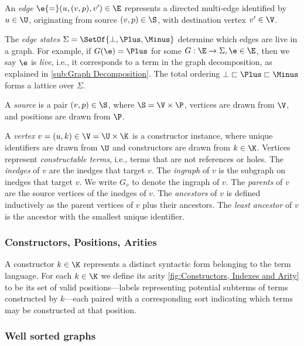 An \emph{edge} $\e{=}(u, (v, p), v^\prime) \in \E$ represents a directed multi-edge
identified by $u \in \U$, originating from source $(v, p) \in \S$, with destination vertex $v' \in \V$.

The \emph{edge states} $\Sigma = \SetOf{\bot, \Plus, \Minus}$ determine which edges are live in a graph.
For example, if $G(\e) = \Plus$ for some $G : \E \rightarrow \Sigma, \e \in \E$,
then we say $\e$ is \emph{live}, i.e., it corresponds to a term in the graph decomposition, as explained in \autoref{sub:Graph Decomposition}.
The total ordering $\bot \sqsubset \Plus \sqsubset \Minus$ forms a lattice over $\Sigma$.

A \emph{source} is a pair $(v, p) \in \S$,
  where $\S = \V \times \P$,
  vertices are drawn from $\V$,
  and positions are drawn from $\P$.

A \emph{vertex} $v = (u, k) \in \V = \U \times \K$ is a constructor instance,
  where unique identifiers are drawn from $\U$
  and constructors are drawn from $k \in \K$.
Vertices represent \emph{constructable terms}, i.e., terms that are not references or holes.
The \emph{inedges} of $v$ are the inedges that target $v$.
The \emph{ingraph} of $v$ is the subgraph on inedges that target $v$.
We write $G_v$ to denote the ingraph of $v$.
The \emph{parents} of $v$ are the source vertices of the inedges of $v$.
The \emph{ancestors} of $v$ is defined inductively as the parent vertices of $v$ plus their ancestors.
The \emph{least ancestor} of $v$ is the ancestor with the smallest unique identifier.


\subsubsection{Constructors, Positions, Arities}
\label{sub:Constructors, Positions, and Arities}

A constructor $k \in \K$ represents a distinct syntactic form belonging to the term language. For each $k \in \K$ we define its arity \autoref{fig:Constructors, Indexes and Arity} to be its set of valid positions—labels representing potential subterms of terms constructed by $k$—each paired with a corresponding sort indicating which terms may be constructed at that position.



\subsubsection{Well sorted graphs}
\label{sub:Well sorted graphs}

